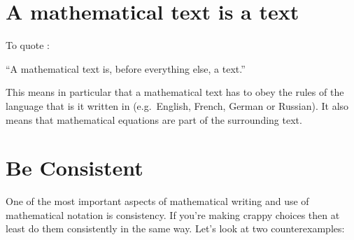 \documentclass[a4paper, 10pt, abstract=on, headings=standardclasses]{scrartcl}
\begin{document}
% 
% 
% 
% 
% 




\section{A mathematical text is a text}
\label{a mathematical text is a text}

To quote \cite{mathoverflow_text}:

\begin{center}
  \enquote{A mathematical text is, before everything else, a text.}
\end{center}

This means in particular that a mathematical text has to obey the rules of the language that is it written in (e.g.\ English, French, German or Russian).
It also means that mathematical equations are part of the surrounding text.





\section{Be Consistent}

One of the most important aspects of mathematical writing and use of mathematical notation is consistency.
If you’re making crappy choices then at least do them consistently in the same way.
Let’s look at two counterexamples:
\end{document}
